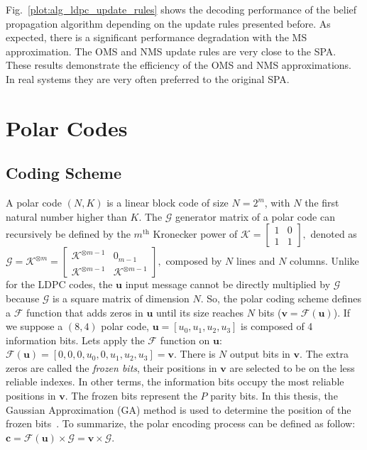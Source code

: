 Fig.~\ref{plot:alg_ldpc_update_rules} shows the decoding performance of the
belief propagation algorithm depending on the update rules presented before.
As expected, there is a significant performance degradation with the MS
approximation. The OMS and NMS update rules are very close to the SPA. These
results demonstrate the efficiency of the OMS and NMS approximations. In real
systems they are very often preferred to the original SPA.

\section{Polar Codes}
\label{sec:alg_polar_decoders}

\subsection{Coding Scheme}

A polar code $(N,K)$ is a linear block code of size $N = 2^m$, with $N$ the
first natural number higher than $K$. The $\bm{\mathcal{G}}$ generator matrix of
a polar code can recursively be defined by the $m^\text{th}$ Kronecker power of
$\bm{\mathcal{K}} =
\begin{bmatrix}
1 & 0 \\
1 & 1
\end{bmatrix},$
denoted as
$
\bm{\mathcal{G}} = \bm{\mathcal{K}}^{\otimes m} =
\begin{bmatrix}
\bm{\mathcal{K}}^{\otimes m-1} & 0_{m -1} \\
\bm{\mathcal{K}}^{\otimes m-1} & \bm{\mathcal{K}}^{\otimes m-1}
\end{bmatrix},
$
composed by $N$ lines and $N$ columns. Unlike for the LDPC codes, the $\bm{u}$
input message cannot be directly multiplied by $\bm{\mathcal{G}}$ because
$\bm{\mathcal{G}}$ is a square matrix of dimension $N$. So, the polar coding
scheme defines a $\mathcal{F}$ function that adds zeros in $\bm{u}$ until its
size reaches $N$ bits ($\bm{v} = \mathcal{F}(\bm{u})$). If we suppose a $(8,4)$
polar code, $\bm{u} = [u_0, u_1, u_2, u_3]$ is composed of 4 information bits.
Lets apply the $\mathcal{F}$ function on $\bm{u}$: $\mathcal{F}(\bm{u}) =
[0, 0, 0, u_0, 0, u_1, u_2, u_3] = \bm{v}$. There is $N$ output bits in
$\bm{v}$. The extra zeros are called the \emph{frozen bits}, their positions in
$\bm{v}$ are selected to be on the less reliable indexes. In other terms, the
information bits occupy the most reliable positions in $\bm{v}$. The frozen bits
represent the $P$ parity bits. In this thesis, the Gaussian Approximation (GA)
method is used to determine the position of the frozen bits~\cite{Trifonov2012}.
To summarize, the polar encoding process can be defined as follow: $\bm{c} =
\mathcal{F}(\bm{u}) \times \bm{\mathcal{G}} = \bm{v} \times \bm{\mathcal{G}}$.

